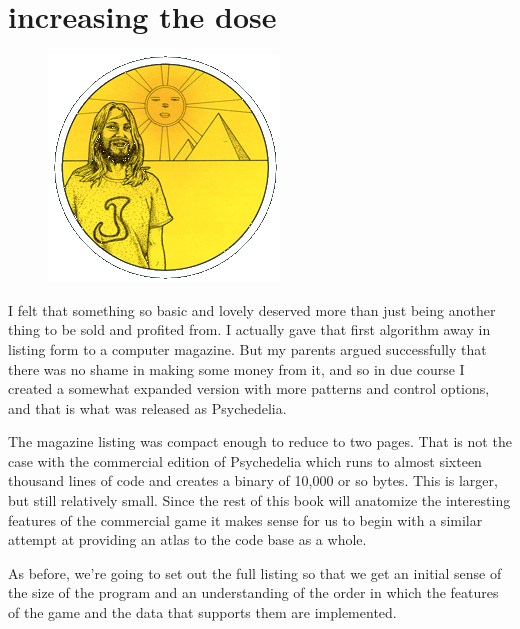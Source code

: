 \chapter{increasing the dose} 
\label{sec:fullgame}
\rhead[]{\leftmark}
\lstset{style=6502Style}
\lstset{ 
   aboveskip=5pt,
   belowskip=0pt,
}
\begin{definition}
\setlength{\intextsep}{0pt}%
\setlength{\columnsep}{3pt}%
\begin{figure}
\includegraphics[width=\linewidth]{src/callout/psych.png} 
\end{figure}
\small
  I felt that something so basic and lovely
  deserved more than just being another thing to be sold and profited from. I
  actually gave that first algorithm away in listing form to a computer
  magazine. But my parents argued successfully that there was no shame in
  making some money from it, and so in due course I created a somewhat expanded
  version with more patterns and control options, and that is what was released
  as Psychedelia.
\end{definition}

The magazine listing was compact enough to reduce to two pages. That is not the case
with the commercial edition of Psychedelia which runs to almost sixteen thousand lines of
code and creates a binary of 10,000 or so bytes. This is larger, but still relatively small. Since the rest of this book will 
anatomize the interesting features of the commercial game it makes sense for us to
begin with a similar attempt at providing an atlas to the code base as a whole.

As before, we're going to set out the full listing so that we get an initial sense of the
size of the program and an understanding of the order in which the features of the game
and the data that supports them are implemented.


\clearpage
